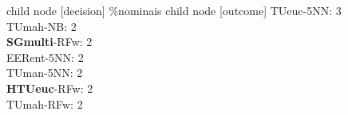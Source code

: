 child {node [decision] {\%nominais}
child {node [outcome] {
TUeuc-5NN: 3\\
TUmah-NB: 2\\
\textbf{SGmulti}-RFw: 2\\
EERent-5NN: 2\\
TUman-5NN: 2\\
\textbf{HTUeuc}-RFw: 2\\
TUmah-RFw: 2\\
}}}
